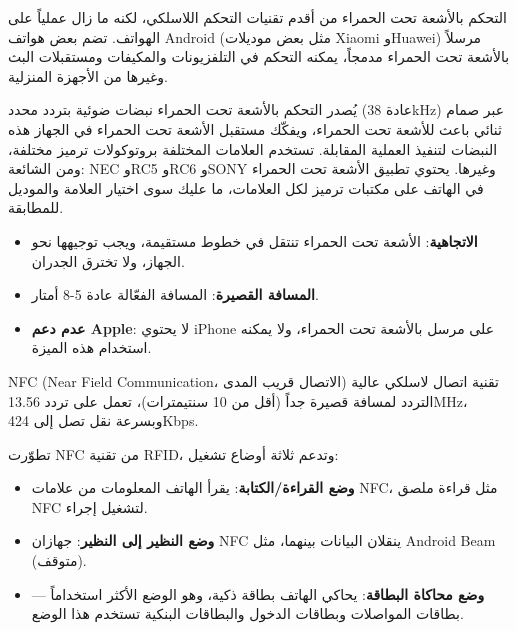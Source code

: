 
التحكم بالأشعة تحت الحمراء من أقدم تقنيات التحكم اللاسلكي، لكنه ما زال عملياً على الهواتف. تضم بعض هواتف Android (مثل بعض موديلات Xiaomi وHuawei) مرسلاً بالأشعة تحت الحمراء مدمجاً، يمكنه التحكم في التلفزيونات والمكيفات ومستقبلات البث وغيرها من الأجهزة المنزلية.


يُصدر التحكم بالأشعة تحت الحمراء نبضات ضوئية بتردد محدد (عادة 38kHz) عبر صمام ثنائي باعث للأشعة تحت الحمراء، ويفكّك مستقبل الأشعة تحت الحمراء في الجهاز هذه النبضات لتنفيذ العملية المقابلة. تستخدم العلامات المختلفة بروتوكولات ترميز مختلفة، ومن الشائعة: NEC وRC5 وRC6 وSONY وغيرها. يحتوي تطبيق الأشعة تحت الحمراء في الهاتف على مكتبات ترميز لكل العلامات، ما عليك سوى اختيار العلامة والموديل للمطابقة.


\begin{itemize}
  \item \textbf{الاتجاهية}: الأشعة تحت الحمراء تنتقل في خطوط مستقيمة، ويجب توجيهها نحو الجهاز، ولا تخترق الجدران.
  \item \textbf{المسافة القصيرة}: المسافة الفعّالة عادة 5-8 أمتار.
  \item \textbf{عدم دعم Apple}: لا يحتوي iPhone على مرسل بالأشعة تحت الحمراء، ولا يمكنه استخدام هذه الميزة.
\end{itemize}


NFC (Near Field Communication، الاتصال قريب المدى) تقنية اتصال لاسلكي عالية التردد لمسافة قصيرة جداً (أقل من 10 سنتيمترات)، تعمل على تردد 13.56MHz، وبسرعة نقل تصل إلى 424Kbps.


تطوّرت NFC من تقنية RFID، وتدعم ثلاثة أوضاع تشغيل:

\begin{itemize}
  \item \textbf{وضع القراءة/الكتابة}: يقرأ الهاتف المعلومات من علامات NFC، مثل قراءة ملصق NFC لتشغيل إجراء.
  \item \textbf{وضع النظير إلى النظير}: جهازان NFC ينقلان البيانات بينهما، مثل Android Beam (متوقف).
  \item \textbf{وضع محاكاة البطاقة}: يحاكي الهاتف بطاقة ذكية، وهو الوضع الأكثر استخداماً — بطاقات المواصلات وبطاقات الدخول والبطاقات البنكية تستخدم هذا الوضع.
\end{itemize}


